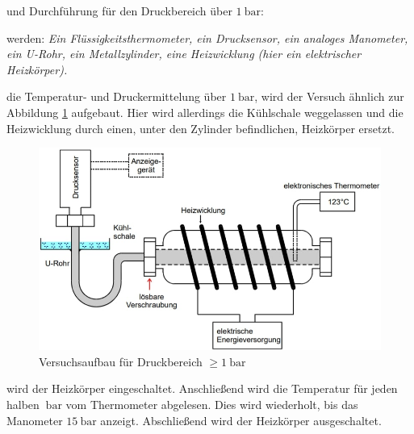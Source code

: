 
\justifying und Durchführung für den Druckbereich über $\SI{1}{\bar}$:

\justifying werden: \textit{Ein Flüssigkeitsthermometer, ein Drucksensor, ein analoges Manometer, ein U-Rohr, ein Metallzylinder, eine Heizwicklung 
(hier ein elektrischer Heizkörper).}

\justifying die Temperatur- und Druckermittelung über $\SI{1}{\bar}$, wird der Versuch ähnlich zur Abbildung \ref{fig:3} aufgebaut. 
Hier wird allerdings die Kühlschale weggelassen und die Heizwicklung durch einen, unter den Zylinder befindlichen, Heizkörper ersetzt. 

\begin{figure}[H]
    \centering
    \includegraphics[width=\linewidth]{./images/g1bar.jpg}
    \caption{Versuchsaufbau für Druckbereich $\geq \SI{1}{\bar}$ \cite{V203}}
    \label{fig:3}
\end{figure}

\justifying wird der Heizkörper eingeschaltet. Anschließend wird die Temperatur für jeden halben $\SI{}{\bar}$ vom Thermometer
abgelesen. Dies wird wiederholt, bis das Manometer $\SI{15}{\bar}$ anzeigt. Abschließend wird der Heizkörper ausgeschaltet.


